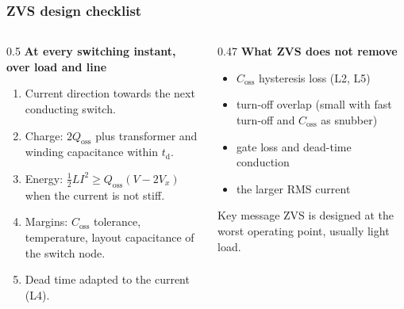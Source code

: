 \begin{frame}
	\frametitle{ZVS design checklist}
	\begin{columns}[T]
		\begin{column}{0.5\textwidth}
			\small
			\textbf{At every switching instant, over load and line}
			\begin{enumerate}
				\item Current direction towards the next conducting switch.
				\item Charge: $2Q_\mathrm{oss}$ plus transformer and winding capacitance within $t_\mathrm{d}$.
				\item Energy: $\frac{1}{2}LI^2\geq Q_\mathrm{oss}(V-2V_x)$ when the current is not stiff.
				\item Margins: $C_\mathrm{oss}$ tolerance, temperature, layout capacitance of the switch node.
				\item Dead time adapted to the current (L4).
			\end{enumerate}
		\end{column}
		\begin{column}{0.47\textwidth}
			\small
			\textbf{What ZVS does not remove}
			\begin{itemize}
				\item $C_\mathrm{oss}$ hysteresis loss (L2, L5)
				\item turn-off overlap (small with fast turn-off and $C_\mathrm{oss}$ as snubber)
				\item gate loss and dead-time conduction
				\item the larger RMS current
			\end{itemize}
			\begin{block}{Key message}
				ZVS is designed at the worst operating point, usually light load.
			\end{block}
		\end{column}
	\end{columns}
\end{frame}


